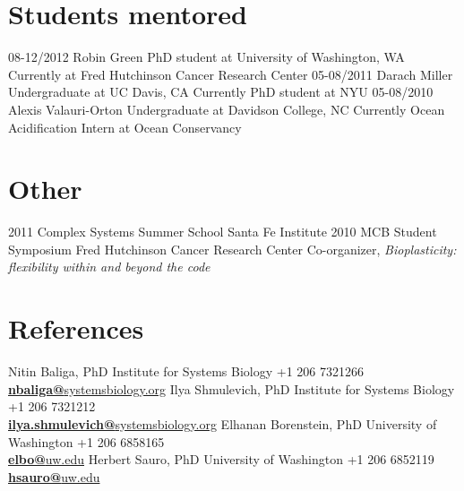 \documentclass[]{friggeri-cv}
\begin{document}
\section{Students mentored}
\begin{entrylist}
  \entry
    {08-12/2012}
    {Robin Green}
    {PhD student at University of Washington, WA}
    {Currently at Fred Hutchinson Cancer Research Center}
  \entry
    {05-08/2011}
    {Darach Miller}
    {Undergraduate at UC Davis, CA}
    {Currently PhD student at NYU}
  \entry
    {05-08/2010}
    {Alexis Valauri-Orton}
    {Undergraduate at Davidson College, NC}
    {Currently ‎Ocean Acidification Intern at Ocean Conservancy}
\end{entrylist}

\section{Other}
\begin{entrylist}
 \entry
    {2011}
    {Complex Systems Summer School}
    {Santa Fe Institute}
    {}
  \entry
    {2010}
    {MCB Student Symposium}
    {Fred Hutchinson Cancer Research Center}
    {Co-organizer, \emph{Bioplasticity: flexibility within and beyond the code}}
\end{entrylist}

\section{References}
\begin{entrylist}
 \entry
    {}
    {Nitin Baliga, PhD}
    {Institute for Systems Biology}
    {+1 206 7321266\\
    \href{mailto:nbaliga@systemsbiology.org}{\textbf{nbaliga@}systemsbiology.org}}
     \entry
    {}
    {Ilya Shmulevich, PhD}
    {Institute for Systems Biology}
    {+1 206 7321212\\
    \href{mailto:ilya.shmulevich@systemsbiology.org}{\textbf{ilya.shmulevich@}systemsbiology.org}}
     \entry
    {}
    {Elhanan Borenstein, PhD}
    {University of Washington}
    {+1 206 6858165\\
    \href{mailto:elbo@uw.edu}{\textbf{elbo@}uw.edu}}
    \entry
    {}
    {Herbert Sauro, PhD}
    {University of Washington}
    {+1 206 6852119\\
    \href{mailto:hsauro@uw.edu}{\textbf{hsauro@}uw.edu}}
\end{entrylist}
\end{document}
